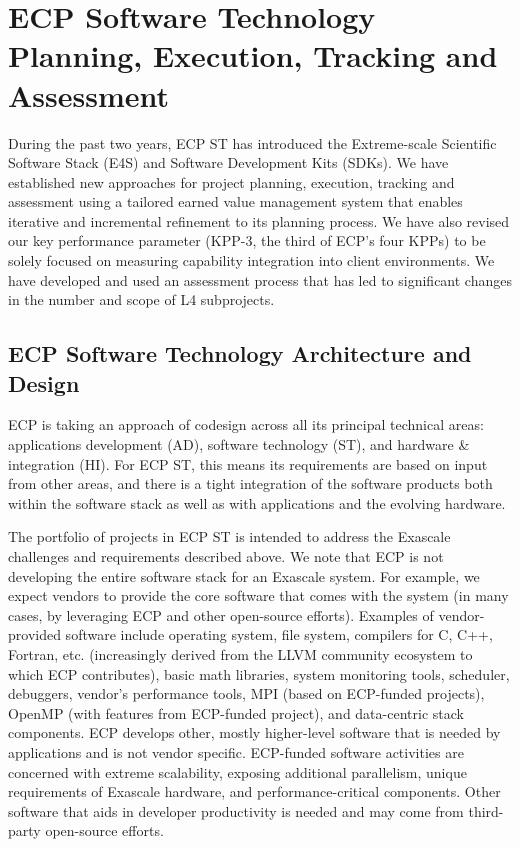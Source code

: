 \section{ECP Software Technology Planning, Execution, Tracking and Assessment}\label{sect:PETA}
During the past two years, ECP ST has introduced the Extreme-scale Scientific Software Stack (E4S) and Software Development Kits (SDKs).  We have established new approaches for project planning, execution, tracking and assessment using a tailored earned value management system that enables iterative and incremental refinement to its planning process.  We have also revised our key performance parameter (KPP-3, the third of ECP's four KPPs) to be solely focused on measuring capability integration into client environments.  We have developed and used an assessment process that has led to significant changes in the number and scope of L4 subprojects.

\subsection{ECP Software Technology Architecture and Design}
ECP is taking an approach of codesign across all its principal technical areas: applications development (AD), software technology (ST), and hardware \& integration (HI). For ECP ST, this means its requirements are based on input from other areas, and there is a tight integration of the software products both within the software stack as well as with applications and the evolving hardware. 

The portfolio of projects in ECP ST is intended to address the Exascale challenges and requirements described above. We note that ECP is not developing the entire software stack for an Exascale system. For example, we expect vendors to provide the core software that comes with the system (in many cases, by leveraging ECP and other open-source efforts). Examples of vendor-provided software include operating system, file system, compilers for C, C++, Fortran, etc. (increasingly derived from the LLVM community ecosystem to which ECP contributes), basic math libraries, system monitoring tools, scheduler, debuggers, vendor’s performance tools, MPI (based on ECP-funded projects), OpenMP (with features from ECP-funded project), and data-centric stack components. ECP develops other, mostly higher-level software that is needed by applications and is not vendor specific. ECP-funded software activities are concerned with extreme scalability, exposing additional parallelism, unique requirements of Exascale hardware, and performance-critical components. Other software that aids in developer productivity is needed and may come from third-party open-source efforts.

